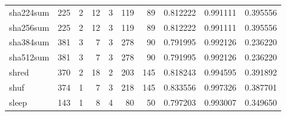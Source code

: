 \begin{tabular}{lrrrrrrrrr}
sha224sum &                    225 &                                  2 &                                12 &                                3 &                               119 &                              89 &                                0.812222 &                               0.991111 &                             0.395556 \\
sha256sum &                    225 &                                  2 &                                12 &                                3 &                               119 &                              89 &                                0.812222 &                               0.991111 &                             0.395556 \\
sha384sum &                    381 &                                  3 &                                 7 &                                3 &                               278 &                              90 &                                0.791995 &                               0.992126 &                             0.236220 \\
sha512sum &                    381 &                                  3 &                                 7 &                                3 &                               278 &                              90 &                                0.791995 &                               0.992126 &                             0.236220 \\
shred     &                    370 &                                  2 &                                18 &                                2 &                               203 &                             145 &                                0.818243 &                               0.994595 &                             0.391892 \\
shuf      &                    374 &                                  1 &                                 7 &                                3 &                               218 &                             145 &                                0.833556 &                               0.997326 &                             0.387701 \\
sleep     &                    143 &                                  1 &                                 8 &                                4 &                                80 &                              50 &                                0.797203 &                               0.993007 &                             0.349650 \\

\end{tabular}
